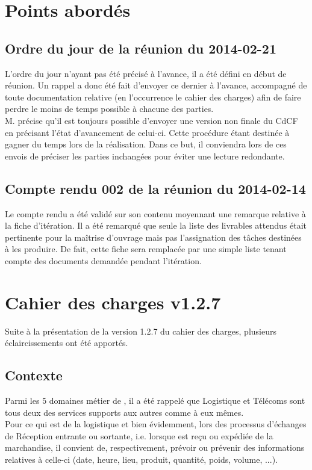 \documentclass[11pt,fleqn]{report}
\begin{document}
\section{Points abordés}

\subsection{Ordre du jour de la réunion du 2014-02-21}
L'ordre du jour n'ayant pas été précisé à l'avance, il a été défini en début de réunion. Un rappel a donc été fait d'envoyer ce dernier à l'avance, accompagné de toute documentation relative (en l'occurrence le cahier des charges) afin de faire perdre le moins de temps possible à chacune des parties.
\\
M. \Agopian précise qu'il est toujours possible d'envoyer une version non finale du CdCF en précisant l'état d'avancement de celui-ci. Cette procédure étant destinée à gagner du temps lors de la réalisation. Dans ce but, il conviendra lors de ces envois de préciser les parties inchangées pour éviter une lecture redondante.

\subsection{Compte rendu 002 de la réunion du 2014-02-14}
Le compte rendu a été validé sur son contenu moyennant une remarque relative à la fiche d'itération. Il a été remarqué que seule la liste des livrables attendus était pertinente pour la maîtrise d'ouvrage mais pas l'assignation des tâches destinées à les produire. De fait, cette fiche sera remplacée par une simple liste tenant compte des documents demandée pendant l'itération.

\section{Cahier des charges v1.2.7}
Suite à la présentation de la version 1.2.7 du cahier des charges, plusieurs éclaircissements ont été apportés.

\subsection{Contexte}
Parmi les 5 domaines métier de \mo, il a été rappelé que Logistique et Télécoms sont tous deux des services supports aux autres comme à eux mêmes.
\\
Pour ce qui est de la logistique et bien évidemment, lors des processus d'échanges de Réception entrante ou sortante, i.e. lorsque est reçu ou expédiée de la marchandise, il convient de, respectivement, prévoir ou prévenir des informations relatives à celle-ci (date, heure, lieu, produit, quantité, poids, volume, ...).
\end{document}
